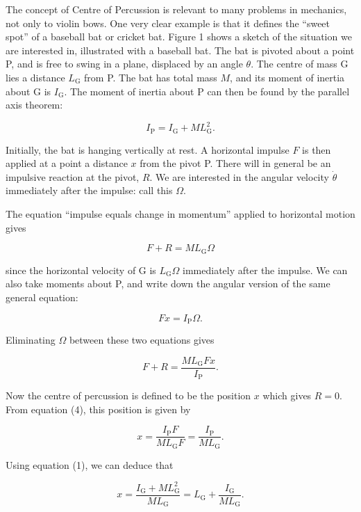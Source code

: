   The concept of Centre of Percussion is relevant to many problems in 
  mechanics, not only to violin bows. One very clear example is that it defines 
  the ``sweet spot'' of a baseball bat or cricket bat. Figure 1 shows a sketch 
  of the situation we are interested in, illustrated with a baseball bat. The 
  bat is pivoted about a point P, and is free to swing in a plane, displaced by 
  an angle $\theta$. The centre of mass G lies a distance $L_{\mathrm{G}}$ from 
  P. The bat has total mass $M$, and its moment of inertia about G is 
  $I_{\mathrm{G}}$. The moment of inertia about P can then be found by the 
  parallel axis theorem: 

  $$I_{\mathrm{P}}=I_{\mathrm{G}}+ML_{\mathrm{G}}^2. \tag{1}$$ 


  Initially, the bat is hanging vertically at rest. A horizontal impulse $F$ is 
  then applied at a point a distance $x$ from the pivot P. There will in 
  general be an impulsive reaction at the pivot, $R$. We are interested in the 
  angular velocity $\dot{\theta}$ immediately after the impulse: call this 
  $\Omega$. 

  The equation ``impulse equals change in momentum'' applied to horizontal 
  motion gives 

  $$F+R=M L_{\mathrm{G}} \Omega \tag{2}$$ 

  since the horizontal velocity of G is $L_{\mathrm{G}} \Omega$ immediately 
  after the impulse. We can also take moments about P, and write down the 
  angular version of the same general equation: 

  $$Fx=I_{\mathrm{P}} \Omega . \tag{3}$$ 

  Eliminating $\Omega$ between these two equations gives 

  $$ F+R=\frac{ML_{\mathrm{G}}Fx}{I_{\mathrm{P}}} . \tag{4}$$ 

  Now the centre of percussion is defined to be the position $x$ which gives 
  $R=0$. From equation (4), this position is given by 

  
  $$x=\frac{I_{\mathrm{P}}F}{ML_{\mathrm{G}}F}=\frac{I_{\mathrm{P}}}{ML_{\mathrm{G}}}. 
  \tag{5}$$ 

  Using equation (1), we can deduce that 

  $$x=\frac{I_{\mathrm{G}}+ML_{\mathrm{G}}^2}{ML_{\mathrm{G}}} = 
  L_{\mathrm{G}}+\frac{I_{\mathrm{G}}}{ML_{\mathrm{G}}}. \tag{6}$$ 

